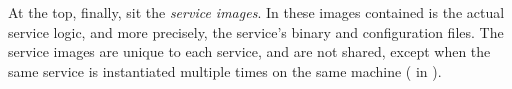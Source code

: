 At the top, finally, sit the \emph{service images}. In these images contained is the actual service logic, and more precisely, the service's binary and configuration files. The service images are unique to each service, and are not shared, except when the same service is instantiated multiple times on the same machine (\cf {} in ).











